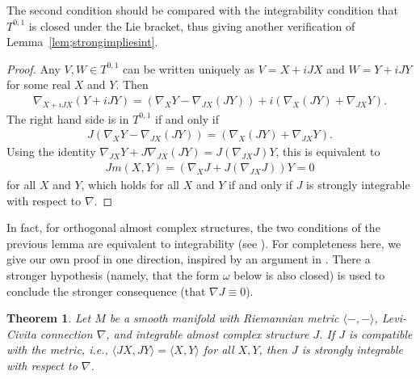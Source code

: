 \documentclass[11pt]{article}
\newtheorem{thm}{Theorem}[section]
\numberwithin{equation}{section}
\begin{document}
The second condition should be compared with the integrability condition that $T^{0,1}$ is closed under the Lie bracket, thus giving another verification of Lemma~\ref{lem;strongimpliesint}.

\begin{proof}Any $V,W \in T^{0,1}$ can be written uniquely as $V = X + iJX$ and $W = Y + iJY$ for some real $X$ and $Y$. Then
\begin{gather*}
\nabla_{X+ iJX} (Y + i JY) = (\nabla_X Y - \nabla_{JX} (JY) ) + i (\nabla_X (JY) + \nabla_{JX} Y ).
\end{gather*}
The right hand side is in $ T^{0,1}$ if and only if
\begin{gather*}
J (\nabla_X Y - \nabla_{JX} (JY) ) = (\nabla_X (JY) + \nabla_{JX} Y ).
\end{gather*}
Using the identity $\nabla_{JX} Y + J\nabla_{JX} (JY) = J ( \nabla_{JX} J ) Y$, this is equivalent to
\begin{gather*}
Jm(X,Y)= ( \nabla_X J +J ( \nabla_{JX} J ) ) Y = 0
\end{gather*}
for all $X$ and $Y$, which holds for all $X$ and $Y$ if and only if $J$ is strongly integrable with respect to $\nabla$.
\end{proof}

In fact, for orthogonal almost complex structures, the two conditions of the previous lemma are equivalent to integrability (see \cite[p.~267]{S}). For completeness here, we give our own proof in one direction, inspired by an argument in \cite[Appendix~C.7]{McS}. There a stronger hypothesis (namely, that the form $\omega$ below is also closed) is used to conclude the stronger consequence (that $\nabla J \equiv 0$).

\begin{thm} \label{thm;Jintorth} Let $M$ be a smooth manifold with Riemannian metric $\langle - ,- \rangle$, Levi-Civita connection $\nabla$, and integrable almost complex structure $J$. If $J$ is compatible with the metric, i.e., $\langle JX,JY \rangle = \langle X,Y \rangle $ for all $X,Y$, then $J$ is strongly integrable with respect to $\nabla$.
\end{thm}
\end{document}
